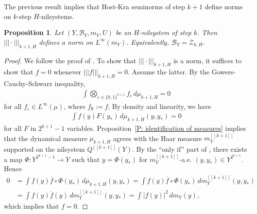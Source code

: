 \documentclass[11pt]{amsart}
\newtheorem{proposition}[lemma]{Proposition}
\theoremstyle{definition}
\DeclareMathOperator*{\E}{\mathbb{E}}
\newcommand{\CB}{{\mathcal B}}
\newcommand{\CZ}{{\mathcal Z}}
\newcommand{\e}{\varepsilon}%
\newcommand{\nnorm}[1]{\lvert\!|\!| #1|\!|\!\rvert}
\newcommand{\cube}[1]{{[\![#1]\!]}}
\newcommand{\1}{{\mathbf{1}}}
\begin{document}
The previous result implies that Host-Kra seminorms of step $k+1$ define norms on $k$-step $H$-nilsystems.
\begin{proposition}\label{P: nilsystems are systems of order k}
Let $(Y, \CB_Y, m_Y, U)$ be an $H$-nilsystem of step $k$. Then $\nnorm{\cdot}_{k+1, H}$ defines a norm on $L^\infty(m_Y)$. Equivalently, $\CB_Y = \CZ_{k,H}$.
\end{proposition}

\begin{proof}
We follow the proof of \cite[Chapter 12, Proposition~16]{HK18}. To show that $\nnorm{\cdot}_{k+1, H}$ is a norm, it suffices to show that $f=0$ whenever $\nnorm{f}_{k+1, H} = 0$. Assume the latter. By the Gowers-Cauchy-Schwarz inequality, 
\begin{align*}
\int \bigotimes_{\e\in\{0,1\}^{k+1}} f_{\epsilon}\,d\mu_{k+1, H}=0     
\end{align*}
 for all $f_{\e}\in L^\infty(\mu)$, where $f_{\emptyset}:=f$. By density and linearity, we have
 \begin{align*}
 \int f(y) F(y_{\ast})\,d\mu_{k+1, H}(y,y_{\ast})=0    
 \end{align*}
  for all $F$ in $2^{k+1}-1$ variables. Proposition~\ref{P: identification of measures} implies that the dynamical measure $\mu_{k+1,H}$ agrees with the Haar measure $m_Y^\cube{k+1}$ supported on the nilsystem $Q^\cube{k+1}(Y)$. By the ``only if'' part of \cite[Proposition~14, Chapter 12]{HK18}, there exists 
    a map $\Phi\colon Y^{2^{k+1}-1}\to Y$ such that 
    $y=\Phi(y_{\ast})$ for $m_Y^\cube{k+1}$-a.e. $(y,y_{\ast})\in Y^{2^{k+1}}$. 
    Hence
    \begin{align*}
            0&=\int f(y) \overline{f}\circ \Phi(y_{\ast})\,d\mu_{k+1,H}(y,y_{\ast}) = \int f(y) \overline{f}\circ \Phi(y_{\ast})\,dm^\cube{k+1}_Y(y,y_{\ast})\\
            &=\int f(y) \overline{f}(y)\,dm^\cube{k+1}_Y(y,y_{\ast})=\int |f(y)|^2\,dm_{Y}(y),        
    \end{align*}
which implies that $f=0$.
\end{proof}



\end{document}
